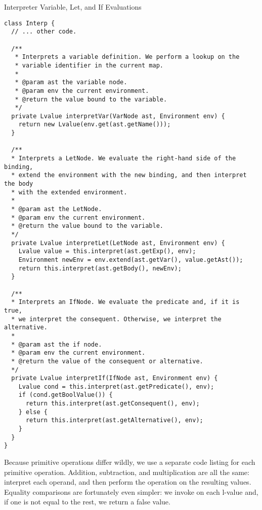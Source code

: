 \begin{cl}{Interpreter Variable, Let, and If Evaluations}
\begin{lstlisting}[language=MyJava]
class Interp {
  // ... other code.

  /**
   * Interprets a variable definition. We perform a lookup on the 
   * variable identifier in the current map.
   * 
   * @param ast the variable node.
   * @param env the current environment. 
   * @return the value bound to the variable.
   */
  private Lvalue interpretVar(VarNode ast, Environment env) {
    return new Lvalue(env.get(ast.getName()));
  }

  /**
  * Interprets a LetNode. We evaluate the right-hand side of the binding,
  * extend the environment with the new binding, and then interpret the body
  * with the extended environment.
  * 
  * @param ast the LetNode.
  * @param env the current environment. 
  * @return the value bound to the variable.
  */
  private Lvalue interpretLet(LetNode ast, Environment env) {
    Lvalue value = this.interpret(ast.getExp(), env);
    Environment newEnv = env.extend(ast.getVar(), value.getAst());
    return this.interpret(ast.getBody(), newEnv);
  }

  /**
  * Interprets an IfNode. We evaluate the predicate and, if it is true,
  * we interpret the consequent. Otherwise, we interpret the alternative.
  * 
  * @param ast the if node.
  * @param env the current environment. 
  * @return the value of the consequent or alternative.
  */
  private Lvalue interpretIf(IfNode ast, Environment env) {
    Lvalue cond = this.interpret(ast.getPredicate(), env);
    if (cond.getBoolValue()) { 
      return this.interpret(ast.getConsequent(), env); 
    } else { 
      return this.interpret(ast.getAlternative(), env); 
    }
  }
}
\end{lstlisting}
\end{cl}

Because primitive operations differ wildly, we use a separate code listing for each primitive operation. Addition, subtraction, and multiplication are all the same: interpret each operand, and then perform the operation on the resulting values. Equality comparisons are fortunately even simpler: we invoke  on each l-value and, if one is not equal to the rest, we return a false value. 

